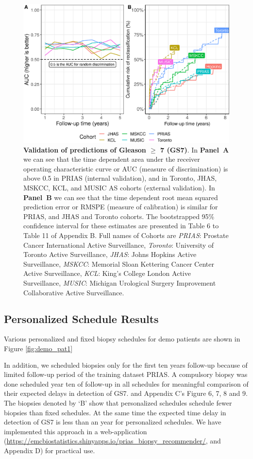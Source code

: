 \begin{figure}
\centerline{\includegraphics[width=\columnwidth]{images/auc_calib.eps}}
\caption{\textbf{Validation of predictions of Gleason $\geq$ 7 (GS7)}. In \textbf{Panel~A} we can see that the time dependent area under the receiver operating characteristic curve or AUC (measure of discrimination) is above 0.5 in PRIAS (internal validation), and in Toronto, JHAS, MSKCC, KCL, and MUSIC AS cohorts (external validation). In \textbf{Panel~B} we can see that the time dependent root mean squared prediction error or RMSPE (measure of calibration) is similar for PRIAS, and JHAS and Toronto cohorts. The bootstrapped 95\% confidence interval for these estimates are presented in Table 6 to Table 11 of Appendix B. Full names of Cohorts are \textit{PRIAS}: Prostate Cancer International Active Surveillance, \textit{Toronto}: University of Toronto Active Surveillance, \textit{JHAS}: Johns Hopkins Active Surveillance, \textit{MSKCC}: Memorial Sloan Kettering Cancer Center Active Surveillance, \textit{KCL}: King's College London Active Surveillance, \textit{MUSIC}: Michigan Urological Surgery Improvement Collaborative Active Surveillance.}
\label{fig:auc_calib}
\end{figure}

\subsection{Personalized Schedule Results}
Various personalized and fixed biopsy schedules for demo patients are shown in Figure \ref{fig:demo_pat1} 

In addition, we scheduled biopsies only for the first ten years follow-up because of limited follow-up period of the training dataset PRIAS. A compulsory biopsy was done scheduled year ten of follow-up in all schedules for meaningful comparison of their expected delays in detection of GS7. and Appendix C's Figure 6, 7, 8 and 9. The biopsies denoted by `B' show that personalized schedules schedule fewer biopsies than fixed schedules. At the same time the expected time delay in detection of GS7 is less than an year for personalized schedules. We have implemented this approach in a web-application (\url{https://emcbiostatistics.shinyapps.io/prias_biopsy_recommender/}, and Appendix D) for practical use.